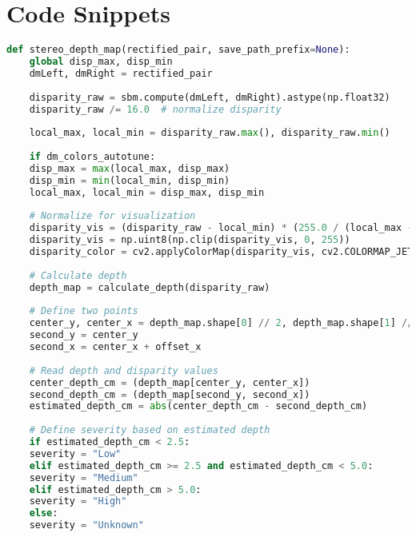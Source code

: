 %
%
%                 

\chapter{Code Snippets}
\label{sec:appendixa}

\begin{lstlisting}[language=Python, caption={Function for generating stereo depth map and classifying pothole severity based on depth difference between two points}]
	def stereo_depth_map(rectified_pair, save_path_prefix=None):
	global disp_max, disp_min
	dmLeft, dmRight = rectified_pair
	
	disparity_raw = sbm.compute(dmLeft, dmRight).astype(np.float32)
	disparity_raw /= 16.0  # normalize disparity
	
	local_max, local_min = disparity_raw.max(), disparity_raw.min()
	
	if dm_colors_autotune:
	disp_max = max(local_max, disp_max)
	disp_min = min(local_min, disp_min)
	local_max, local_min = disp_max, disp_min
	
	# Normalize for visualization
	disparity_vis = (disparity_raw - local_min) * (255.0 / (local_max - local_min))
	disparity_vis = np.uint8(np.clip(disparity_vis, 0, 255))
	disparity_color = cv2.applyColorMap(disparity_vis, cv2.COLORMAP_JET)
	
	# Calculate depth
	depth_map = calculate_depth(disparity_raw)
	
	# Define two points
	center_y, center_x = depth_map.shape[0] // 2, depth_map.shape[1] // 2 - 20
	second_y = center_y
	second_x = center_x + offset_x
	
	# Read depth and disparity values
	center_depth_cm = (depth_map[center_y, center_x]) 
	second_depth_cm = (depth_map[second_y, second_x]) 
	estimated_depth_cm = abs(center_depth_cm - second_depth_cm)
	
	# Define severity based on estimated depth
	if estimated_depth_cm < 2.5:
	severity = "Low"
	elif estimated_depth_cm >= 2.5 and estimated_depth_cm < 5.0:
	severity = "Medium"
	elif estimated_depth_cm > 5.0:
	severity = "High"
	else:
	severity = "Unknown"
\end{lstlisting}

